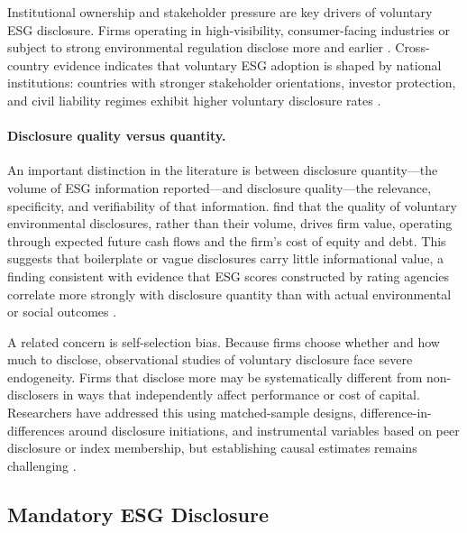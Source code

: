 Institutional ownership and stakeholder pressure are key drivers of voluntary
ESG disclosure. Firms operating in high-visibility, consumer-facing industries
or subject to strong environmental regulation disclose more and earlier
\citep{Ioannou2012_reporting}. Cross-country evidence indicates that voluntary
ESG adoption is shaped by national institutions: countries with stronger
stakeholder orientations, investor protection, and civil liability regimes
exhibit higher voluntary disclosure rates \citep{Liang2017_foundations}.

\paragraph{Disclosure quality versus quantity.}
An important distinction in the literature is between disclosure quantity---the
volume of ESG information reported---and disclosure quality---the relevance,
specificity, and verifiability of that information. \textcite{Plumlee2015_environmental}
find that the quality of voluntary environmental disclosures, rather than their
volume, drives firm value, operating through expected future cash flows and the
firm's cost of equity and debt. This suggests that boilerplate or vague
disclosures carry little informational value, a finding consistent with evidence
that ESG scores constructed by rating agencies correlate more strongly with
disclosure quantity than with actual environmental or social outcomes
\citep{Berg2022_disagreement}.

A related concern is self-selection bias. Because firms choose whether and how
much to disclose, observational studies of voluntary disclosure face severe
endogeneity. Firms that disclose more may be systematically different from
non-disclosers in ways that independently affect performance or cost of capital.
Researchers have addressed this using matched-sample designs,
difference-in-differences around disclosure initiations, and instrumental
variables based on peer disclosure or index membership, but establishing causal
estimates remains challenging \citep{Christensen2021_mandatory}.

\subsection{Mandatory ESG Disclosure}
\label{subsec:mandatory_disclosure}

